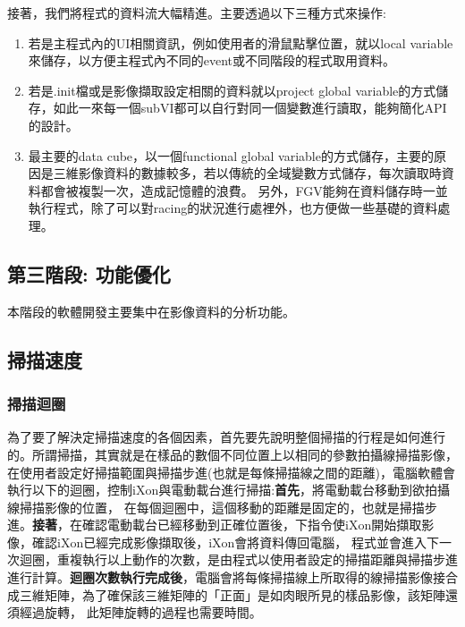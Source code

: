 \documentclass[12pt]{article}
\begin{document}
接著，我們將程式的資料流大幅精進。主要透過以下三種方式來操作:
\begin{enumerate}
    \item 若是主程式內的UI相關資訊，例如使用者的滑鼠點擊位置，就以local variable來儲存，以方便主程式內不同的event或不同階段的程式取用資料。
    \item 若是.init檔或是影像擷取設定相關的資料就以project global variable的方式儲存，如此一來每一個subVI都可以自行對同一個變數進行讀取，能夠簡化API的設計。
    \item 最主要的data cube，以一個functional global variable的方式儲存，主要的原因是三維影像資料的數據較多，若以傳統的全域變數方式儲存，每次讀取時資料都會被複製一次，造成記憶體的浪費。
          另外，FGV能夠在資料儲存時一並執行程式，除了可以對racing的狀況進行處裡外，也方便做一些基礎的資料處理。
\end{enumerate}

\subsection{第三階段: 功能優化}
本階段的軟體開發主要集中在影像資料的分析功能。

\subsection{掃描速度}
\subsubsection{掃描迴圈}
為了要了解決定掃描速度的各個因素，首先要先說明整個掃描的行程是如何進行的。所謂掃描，其實就是在樣品的數個不同位置上以相同的參數拍攝線掃描影像，
在使用者設定好掃描範圍與掃描步進(也就是每條掃描線之間的距離)，電腦軟體會執行以下的迴圈，控制iXon與電動載台進行掃描:\textbf{首先}，將電動載台移動到欲拍攝線掃描影像的位置，
在每個迴圈中，這個移動的距離是固定的，也就是掃描步進。\textbf{接著}，在確認電動載台已經移動到正確位置後，下指令使iXon開始擷取影像，確認iXon已經完成影像擷取後，iXon會將資料傳回電腦，
程式並會進入下一次迴圈，重複執行以上動作的次數，是由程式以使用者設定的掃描距離與掃描步進進行計算。\textbf{迴圈次數執行完成後}，電腦會將每條掃描線上所取得的線掃描影像接合成三維矩陣，為了確保該三維矩陣的「正面」是如肉眼所見的樣品影像，該矩陣還須經過旋轉，
此矩陣旋轉的過程也需要時間。
\end{document}

